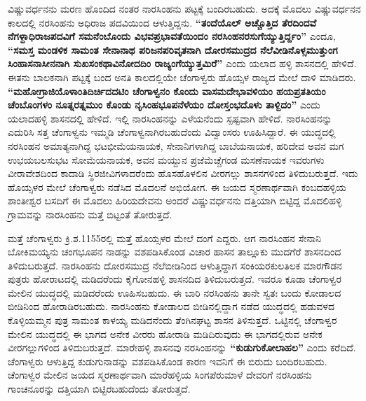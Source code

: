 ವಿಷ್ಣುವರ್ಧನನು ಮರಣ ಹೊಂದಿದ ನಂತರ ನಾರಸಿಂಹನು ಪಟ್ಟಕ್ಕೆ ಬಂದಿರಬಹುದು. ಅದಕ್ಕೆ ಮೊದಲು ವಿಷ್ಣುವರ್ಧನನ ಕಾಲದಲ್ಲಿ ನರಸಿಂಹನು ಅಧಿರಾಜ ಪದವಿಯಿಂದ ಆಳುತ್ತಿದ್ದನು. \textbf{“ತಂದೆಯೊಲ್​ ಅಚ್ಚೊತ್ತಿದ ತೆರದಿಂದವೆ ನೆಗಳ್ದಾಧಿರಾಜಪದವಿಗೆ ಸಮನೆಂಬೊಂದು ವಿಭವಪ್ರಭಾವತೆಯಿಂದಂ ನರಸಿಂಹನರಸುಗೆಯ್ಯುತ್ತಿರ್ದ್ದಂ”} ಎಂದೂ, \textbf{“ಸಮಸ್ತ ಮಂಡಳಿಕ ಸಾಮಂತ ಸೇನಾನಾಥ ಪರಿಜನಪರಿವೃತನಾಗಿ ದೋರಸಮುದ್ರದ ನೆಲೆವೀಡಿನೊಳ್ಸಮುತ್ತುಂಗ ಸಿಂಹಾಸನಾಸೀನನಾಗಿ ಸುಖಸಂಕಥಾವಿನೋದದಿಂ ರಾಜ್ಯಂಗೆಯ್ಯುತ್ತಮಿರೆ”} ಎಂದು ಯಲಾದ ಹಳ್ಳಿ ಶಾಸನದಲ್ಲಿ ಹೇಳಿದೆ. ಈತನು ಬಾಲಕನಾಗಿ ಪಟ್ಟಕ್ಕೆ ಬಂದ ಅನತಿ ಕಾಲದಲ್ಲಿಯೇ ಚೆಂಗಾಳ್ವರು ಹೊಯ್ಸಳ ರಾಜ್ಯದ ಮೇಲೆ ದಾಳಿ ಮಾಡಿದರು. \textbf{“ಮಹೋಗ್ರಾಜಿಯೊಳಾಂತಿದಿರ್ಚಿ\-ದದಟಿಂ ಚೆಂಗಾಳ್ವನಂ ಕೊಂದು ವಾಸಮದೇಭಾವಳಿಯಂ ಹಯಪ್ರತತಿಯಂ ಚೆಂಬೊಂಗಳಂ ನೂತ್ನರತ್ನಮುಂ ಕೊಂಡು\general{\break } ನೃಸಿಂಹಭೂಪನೆಳೆಯಂ ದೋಸ್ತಂಭದೊಳು ತಾಳ್ದಿದಂ”} ಎಂದು ಯಲಾದಹಳ್ಳಿ ಶಾಸನದಲ್ಲಿ ಹೇಳಿದೆ. ಇಲ್ಲಿ ನಾರಸಿಂಹನನ್ನು ಎಳೆಯನೆಂದು ಸ್ಪಷ್ಟವಾಗಿ ಹೇಳಿದೆ. ನಾರಸಿಂಹನನ್ನು ಎದುರಿಸಿ ಸತ್ತ ಚೆಂಗಾಳ್ವನು ಇಮ್ಮಡಿ ಚೆಂಗಾಳ್ವನಾಗಿರಬಹುದೆಂದು ವಿದ್ವಾಂಸರು ಊಹಿಸಿದ್ದಾರೆ. ಈ ಯುದ್ಧದಲ್ಲಿ ನರಸಿಂಹನ ಅಮಾತ್ಯನಾಗಿದ್ದ ಭಟಭೀಮೆಯನಾಯಕ, ಸೇನಾನಿಗಳಾಗಿದ್ದ ಬಾಬೆಯನಾಯಕ, ಹರಿದೇವ ಅವನ ಮಗ ಉಭಯಬಲಸುಭಟ ಸೋಮೆಯನಾಯಕ, ಅವನ ಮಯ್ದುನ ಪ್ರಜೆಮೆಚ್ಚೆಗಂಡ ಮಸಣೆನಾಯಕ ಇವರುಗಳು ವೀರಾವೇಶದಿಂದ ಕಾದಾಡಿ ಸ್ಥಿರಜೀವಿಗಳಾದರೆಂದು ಹೊಸಹೊಳಲಿನ ವೀರಗಲ್ಲು ಶಾಸನಗಳಿಂದ ತಿಳಿದುಬರುತ್ತದೆ. ಇದು ಹೊಯ್ಸಳರ ಮೇಲೆ ಚೆಂಗಾಳ್ವರು ನಡೆಸಿದ ಮೊದಲನೆ ಅಭಿಯೋಗ. ಈ ಜಯದ ಸ್ಮರಣಾರ್ಥವಾಗಿ ಕಂಬದಹಳ್ಳಿಯ ಶಾಂತೀಶ್ವರ ಬಸದಿಗೆ ಈ ಮೊದಲು ಹಿರಿಯದೇವನು ಅಂದರೆ ವಿಷ್ಣುವರ್ಧನನು ದತ್ತಿಯಾಗಿ ಬಿಟ್ಟಿದ್ದ ಮೊದಲಿಹಳ್ಳಿ ಗ್ರಾಮವನ್ನು ನಾರಸಿಂಹನು ಮತ್ತೆ ಬಿಟ್ಟಂತೆ ತೋರುತ್ತದೆ.

ಮತ್ತೆ ಚೆಂಗಾಳ್ವರು ಕ್ರಿ.ಶ.1155ರಲ್ಲಿ ಮತ್ತೆ ಹೊಯ್ಸಳರ ಮೇಲೆ ದಂಗೆ ಎದ್ದರು. ಆಗ ನಾರಸಿಂಹನ ಸೇನಾನಿ ಬೋಕಿಮಯ್ಯನು ಚಂಗಭೂಪನ ನಾಡನ್ನು ವಶಪಡಿಸಿಕೊಂಡ ವಿಚಾರ ಹಾಸನ ತಾಲ್ಲೂಕು ಮುದಗೆರೆ ಶಾಸನದಿಂದ ತಿಳಿದುಬರುತ್ತದೆ. ನಾರಸಿಂಹನು ದೋರಸಮುದ್ರ ನೆಲೆಬೀಡಿನಿಂದ ಆಳುತ್ತಿದ್ದಾಗ ಸಂಕಿಯರಕುಲತಿಲಕ ಮಾರಗೌಡನ ಪುತ್ರರು ಹೋರಾಟದಲ್ಲಿ ಮಡಿದರೆಂದು ಕೈಗೋನಹಳ್ಳಿ ಶಾಸನದಿದ ತಿಳಿದುಬರುತ್ತದೆ. ಇವರೂ ಕೂಡಾ ಚೆಂಗಾಳ್ವರ ಮೇಲಿನ ಯುದ್ಧದಲ್ಲಿ ಮಡಿದರೆಂದು ಊಹಿಸಬಹುದು. ಈ ಬಾರಿ ನರಸಿಂಹನು ತಾನೇ ಸ್ವತಃ ಬಂದು ಕೋಡಾಲದ ಬೀಡಿನಿಂದ ಹೋರಾಡಿರಬಹುದು. ನಾರಸಿಂಹನು ಕೋಡಾಲದ ಬೀಡಿನಲ್ಲಿದ್ದಾಗ ನಡೆದ ಯುದ್ಧದಲ್ಲಿ ಹಡುವಳದ ಕೊಳ್ಳಿಯಮ್ಮನ ಪುತ್ರ ಸಾಮಂತ ಕಾಳಯ್ಯ ಮಡಿದನೆಂದು ತೆಂಗಿನಘಟ್ಟ ಶಾಸನ ತಿಳಿಸುತ್ತದೆ. ಒಟ್ಟಿನಲ್ಲಿ ಚೆಂಗಾಳ್ವರ ಮೇಲಿನ ಯುದ್ಧದಲ್ಲಿ ಈ ಭಾಗದ ಅನೇಕ ವೀರರು ಹೋರಾಡಿ ಮಡಿದಿರುವುದು ಈ ಭಾಗದಲ್ಲಿರುವ ಅನೇಕ ವೀರಗಲ್ಲುಗಳಿಂದ ತಿಳಿದುಬರುತ್ತದೆ. ಮಾರೇಹಳ್ಳಿ ಶಾಸನವು ನರಸಿಂಹನನ್ನು \textbf{“ಕುಡುಗುಕೋಲಾಹಲ”} ಎಂದು ಕರೆದಿದೆ. ಚೆಂಗಾಳ್ವರು ಆಳುತ್ತಿದ್ದ ಕುಡುಗುನಾಡನ್ನು ವಶಪಡಿಸಿಕೊಂಡ ಕಾರಣ ಇವನಿಗೆ ಈ ಬಿರುದು ಬಂದಿರಬಹುದು. ಚೆಂಗಾಳ್ವರ ಮೇಲಿನ ಜಯದ ಸ್ಮರಣಾರ್ಥವಾಗಿ ಮಾರೆಹಳ್ಳಿಯ ಸಿಂಗಪೆರುಮಾಳೆ ದೇವರಿಗೆ ನರಸಿಂಹನು ಗಾಂಚನೂರನ್ನು ದತ್ತಿಯಾಗಿ ಬಿಟ್ಟಿರಬಹುದೆಂದು ತೋರುತ್ತದೆ.


